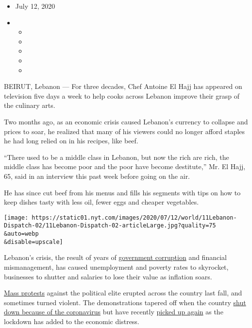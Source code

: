 \begin{itemize}
\item
  July 12, 2020
\item
  \begin{itemize}
  \item
  \item
  \item
  \item
  \item
  \end{itemize}
\end{itemize}

BEIRUT, Lebanon --- For three decades, Chef Antoine El Hajj has appeared
on television five days a week to help cooks across Lebanon improve
their grasp of the culinary arts.

Two months ago, as an economic crisis caused Lebanon's currency to
collapse and prices to soar, he realized that many of his viewers could
no longer afford staples he had long relied on in his recipes, like
beef.

``There used to be a middle class in Lebanon, but now the rich are rich,
the middle class has become poor and the poor have become destitute,''
Mr. El Hajj, 65, said in an interview this past week before going on the
air.

He has since cut beef from his menus and fills his segments with tips on
how to keep dishes tasty with less oil, fewer eggs and cheaper
vegetables.

\texttt{[image: https://static01.nyt.com/images/2020/07/12/world/11Lebanon-Dispatch-02/11Lebanon-Dispatch-02-articleLarge.jpg?quality=75\\\&auto=webp\\\&disable=upscale]}

Lebanon's crisis, the result of years of
\href{https://www.nytimes.com/2019/12/03/world/middleeast/lebanon-protests-corruption.html}{government
corruption} and financial mismanagement, has caused unemployment and
poverty rates to skyrocket, businesses to shutter and salaries to lose
their value as inflation soars.

\href{https://www.nytimes.com/2019/11/15/world/middleeast/lebanon-protests-economy.html}{Mass
protests} against the political elite erupted across the country last
fall, and sometimes turned violent. The demonstrations tapered off when
the country
\href{https://www.nytimes.com/2020/05/03/world/middleeast/beirut-lebanon-nightlife-coronavirus.html}{shut
down because of the coronavirus} but have recently
\href{https://www.nytimes.com/2020/06/11/world/middleeast/lebanon-protests.html}{picked
up again} as the lockdown has added to the economic distress.

